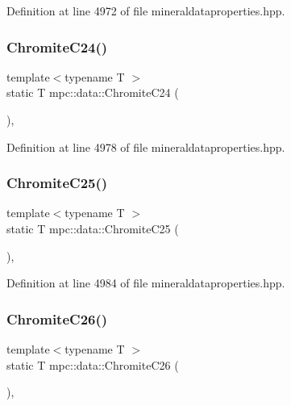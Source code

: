 Definition at line 4972 of file mineraldataproperties.\+hpp.

\mbox{\label{namespacempc_1_1data_affe2cfeb4ec1cb7cbd4b7eb552a91521}} 
\subsubsection{\texorpdfstring{Chromite\+C24()}{ChromiteC24()}}
{\footnotesize\ttfamily template$<$typename T $>$ \\
static T mpc\+::data\+::\+Chromite\+C24 (\begin{DoxyParamCaption}{ }\end{DoxyParamCaption})\hspace{0.3cm}{\ttfamily [inline]}, {\ttfamily [static]}}



Definition at line 4978 of file mineraldataproperties.\+hpp.

\mbox{\label{namespacempc_1_1data_a1464d8fe48384d63e0283f92b64103c6}} 
\subsubsection{\texorpdfstring{Chromite\+C25()}{ChromiteC25()}}
{\footnotesize\ttfamily template$<$typename T $>$ \\
static T mpc\+::data\+::\+Chromite\+C25 (\begin{DoxyParamCaption}{ }\end{DoxyParamCaption})\hspace{0.3cm}{\ttfamily [inline]}, {\ttfamily [static]}}



Definition at line 4984 of file mineraldataproperties.\+hpp.

\mbox{\label{namespacempc_1_1data_a688d688d1a2a0992174a2cf65faea24d}} 
\subsubsection{\texorpdfstring{Chromite\+C26()}{ChromiteC26()}}
{\footnotesize\ttfamily template$<$typename T $>$ \\
static T mpc\+::data\+::\+Chromite\+C26 (\begin{DoxyParamCaption}{ }\end{DoxyParamCaption})\hspace{0.3cm}{\ttfamily [inline]}, {\ttfamily [static]}}



